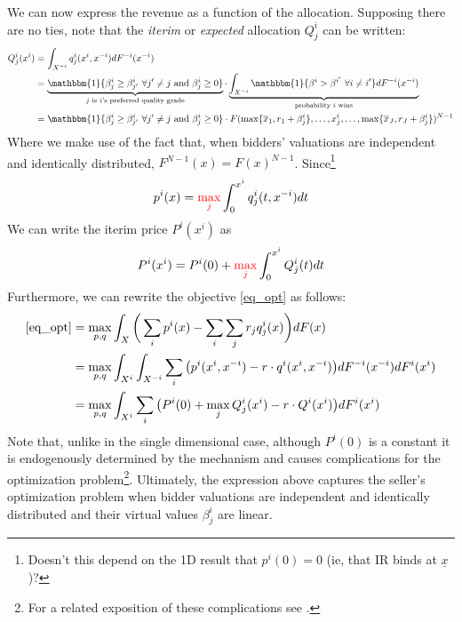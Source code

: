 \documentclass{article}
\begin{document}
We can now express the revenue as a function of the allocation. Supposing there are no ties, note that the \textit{iterim} or \textit{expected} allocation $Q_j^i$ can be written:
\begin{align}
    Q_j^i(x^i) &= \int_{X^{-i}} q_j^i(x^i,x^{-i}) dF^{-i}(x^{-i}) \\
        &= \underbrace{\mathbbm{1} \{ \beta_j^i \geq \beta_{j'}^i \ \forall j' \neq j \text{ and } \beta_j^i \geq 0 \}}_{\text{$j$ is $i$'s preferred quality grade}} \cdot \underbrace{\int_{X^{-i}} \mathbbm{1} \{ \beta^i > \beta^{i'} \ \forall i \neq i' \} dF^{-i}(x^{-i})}_{\text{probability $i$ wins}} \\
        &= \mathbbm{1} \{ \beta_j^i \geq \beta_{j'}^i \ \forall j' \neq j \text{ and } \beta_j^i \geq 0 \} \cdot F(\max \{ \overline{x}_1, r_1 + \beta_j^i \}, \dots, x_j^i, \dots, \max \{ \overline{x}_J, r_J + \beta_j^i \})^{N-1}
\end{align}
\noindent Where we make use of the fact that, when bidders' valuations are independent and identically distributed, $F^{N-1}(x) = F(x)^{N-1}$. Since\footnote{\color{red}Doesn't this depend on the 1D result that $p^i(0)=0$ (ie, that IR binds at $\underline{x}$)?} 
\begin{equation}
    p^i(x) = {\color{red}\max_j} \int_0^{x^i} q_j^i(t, x^{-i}) dt
\end{equation}
\noindent We can write the iterim price $P^i(x^i)$ as
\begin{equation}
    P^i(x^i) = P^i(0) + {\color{red}\max_j} \int_0^{x^i} Q_j^i(t) dt
\end{equation}
\noindent Furthermore, we can rewrite the objective \ref{eq_opt} as follows:
\begin{align}
    \ref{eq_opt} &= \max_{p,q} \int_X \bigg( \sum_i p^i(x)  - \sum_i \sum_j r_j q_j^i(x) \bigg) dF(x) \\
        &= \max_{p,q} \int_{X^i} \int_{X^{-i}} \sum_i \big( p^i(x^i, x^{-i}) - r \cdot q^i(x^i, x^{-i}) \big) dF^{-i}(x^{-i}) dF^i(x^i) \\
        &= \max_{p,q} \int_{X^i} \sum_i \big( P^i(0) + \max_j Q_j^i(x^i) - r \cdot Q^i(x^i) \big) dF^i(x^i)
\end{align}
\noindent Note that, unlike in the single dimensional case, although $P^i(0)$ is a constant it is endogenously determined by the mechanism and causes complications for the optimization problem\footnote{For a related exposition of these complications see \autocite{jullien2000}.}. Ultimately, the expression above captures the seller's optimization problem when bidder valuations are independent and identically distributed and their virtual values $\beta_j^i$ are linear.
\end{document}
